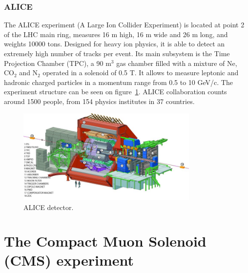 
\subsubsection{ALICE}
\label{sec:alice}

The ALICE experiment (A Large Ion Collider Experiment) is located at point 2 of the LHC main ring, measures 16 m high, 16 m wide and 26 m long, and weights 10000 tons. Designed for heavy ion physics, it is able to detect an extremely high number of tracks per event. Its main subsystem is the Time Projection Chamber (TPC), a 90 $\text{m}^{3}$ gas chamber filled with a mixture of Ne, $\text{CO}_{2}$ and $\text{N}_{2}$ operated in a solenoid of 0.5 T. It allows to measure leptonic and hadronic charged particles in a momentum range from 0.5 to 10 GeV/c. The experiment structure can be seen on figure~\ref{fig:alicedet}. ALICE collaboration counts around 1500 people, from 154 physics institutes in 37 countries.

\begin{figure}[!Hhtbp]
  \begin{center}
    \includegraphics[width=0.8\textwidth]{figs/alice2.jpg}
    \caption{ALICE detector.}
    \label{fig:alicedet}
  \end{center}
\end{figure}

\section{The Compact Muon Solenoid (CMS) experiment}
\label{sec:CMS}

